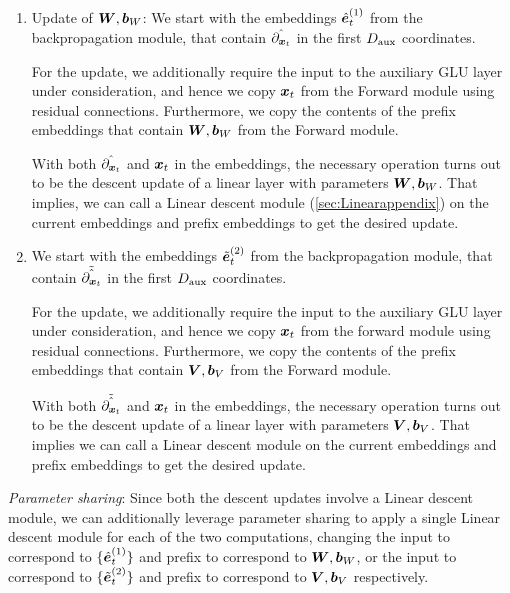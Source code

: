 \begin{enumerate}
    \item Update of ${\bm{W}}, {\bm{b}}_W$: We start with the embeddings $\Hat{\ve}^{(1)}_t$ from the  backpropagation module, that contain $\Hat{\partial_{{\bm{x}}_t}}$ in the first $D_{\text{aux}}$ coordinates. 

    For the update, we additionally require the input to the auxiliary GLU layer under consideration, and hence we copy ${\bm{x}}_t$ from the Forward module using residual connections. Furthermore, we copy the contents of the prefix embeddings that contain ${\bm{W}}, {\bm{b}}_W$ from the Forward module.

    With both $\Hat{\partial_{{\bm{x}}_t}}$ and ${\bm{x}}_t$ in the embeddings, the necessary operation turns out to be the descent update of a linear layer with parameters ${\bm{W}}, {\bm{b}}_W$. That implies, we can call a \simulator{} Linear descent module (\cref{sec:Linearappendix}) on the current embeddings and prefix embeddings to get the desired update.
    

    \item We start with the embeddings $\Tilde{\ve}^{(2)}_t$ from the  backpropagation module, that contain $\Tilde{\Hat{\partial_{{\bm{x}}_t}}}$ in the first $D_{\text{aux}}$ coordinates. 

    For the update, we additionally require the input to the auxiliary GLU layer under consideration, and hence we copy ${\bm{x}}_t$ from the forward module using residual connections. Furthermore, we copy the contents of the prefix embeddings  that contain ${\bm{V}}, {\bm{b}}_V$ from the Forward module.

    With both $\Tilde{\Hat{\partial_{{\bm{x}}_t}}}$ and ${\bm{x}}_t$ in the embeddings, the necessary operation turns out to be the descent update of a linear layer with parameters ${\bm{V}}, {\bm{b}}_V$. That implies we can call a \simulator{} Linear descent module on the current embeddings and prefix embeddings to get the desired update.
\end{enumerate}
\textit{Parameter sharing}: Since both the descent updates involve a Linear descent
module, we can additionally leverage parameter sharing to apply a single \simulator{} Linear descent module for each of the two computations, changing the input to correspond to $\{\Hat{\ve}^{(1)}_t\}$ and prefix to correspond to ${\bm{W}}, {\bm{b}}_W$, or the input to correspond to $\{\Tilde{\ve}^{(2)}_t\}$ and prefix to correspond to ${\bm{V}}, {\bm{b}}_V$ respectively.









